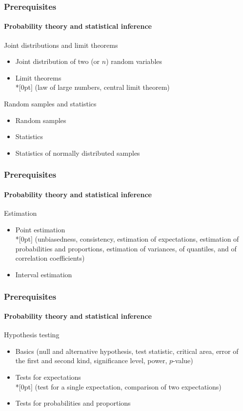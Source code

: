 \documentclass[notes=show]{beamer}
\begin{document}
\begin{frame}\frametitle{Prerequisites}\framesubtitle{Probability theory and statistical inference}
Joint distributions and limit theorems
\begin{itemize}
    \item Joint distribution of two (or $n$) random variables
    \item Limit theorems\\*[0pt]
        (law of large numbers, central limit theorem)
\end{itemize}

Random samples and statistics
\begin{itemize}
    \item Random samples
    \item Statistics
    \item Statistics of normally distributed samples
\end{itemize}
\end{frame}


\begin{frame}\frametitle{Prerequisites}\framesubtitle{Probability theory and statistical inference}
Estimation
\begin{itemize}
    \item Point estimation\\*[0pt]
        (unbiasedness, consistency, estimation of expectations, estimation of probabilities and proportions, estimation of variances, of quantiles, and of correlation coefficients)
    \item Interval estimation
\end{itemize}
\end{frame}


\begin{frame}\frametitle{Prerequisites}\framesubtitle{Probability theory and statistical inference}
Hypothesis testing
\begin{itemize}
    \item Basics (null and alternative hypothesis, test statistic, critical area, error of the first and second kind, significance level, power, $p$-value)
    \item Tests for expectations\\*[0pt]
        (test for a single expectation, comparison of two expectations)
    \item Tests for probabilities and proportions
\end{itemize}
\end{frame}
\end{document}
